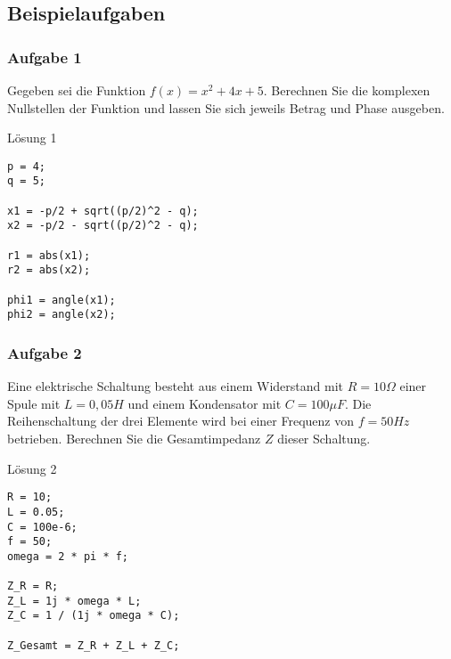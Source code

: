         \subsection{Beispielaufgaben}
                \subsubsection*{Aufgabe 1}
                Gegeben sei die Funktion $f(x) = x^2 +4x +5$. Berechnen Sie die komplexen Nullstellen der Funktion und lassen Sie sich jeweils Betrag und Phase ausgeben.
                \begin{Codelösung}{Lösung 1}
                    \begin{lstlisting}
p = 4;
q = 5;

x1 = -p/2 + sqrt((p/2)^2 - q);
x2 = -p/2 - sqrt((p/2)^2 - q);

r1 = abs(x1);
r2 = abs(x2);

phi1 = angle(x1);
phi2 = angle(x2);
                    \end{lstlisting}
                    
                \end{Codelösung}


                \subsubsection*{Aufgabe 2}
                Eine elektrische Schaltung besteht aus einem Widerstand mit $R=10\Omega$ einer Spule mit $L=0,05H$ und einem Kondensator mit $C=100\mu F$. Die Reihenschaltung der drei Elemente wird bei einer Frequenz von $f=50Hz$ betrieben. Berechnen Sie die Gesamtimpedanz $Z$ dieser Schaltung.
                \begin{Codelösung}{Lösung 2}
                    \begin{lstlisting}
R = 10;
L = 0.05;
C = 100e-6;
f = 50;
omega = 2 * pi * f;

Z_R = R;
Z_L = 1j * omega * L;
Z_C = 1 / (1j * omega * C);

Z_Gesamt = Z_R + Z_L + Z_C;
                    \end{lstlisting}   
                \end{Codelösung}
                